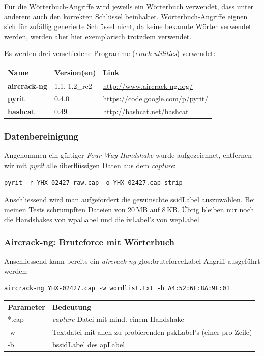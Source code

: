 Für die Wörterbuch-Angriffe wird jeweils ein Wörterbuch verwendet, dass unter anderem auch den korrekten Schlüssel beinhaltet.
Wörterbuch-Angriffe eignen sich für zufällig generierte Schlüssel nicht, da keine bekannte Wörter verwendet werden, werden aber hier exemplarisch trotzdem verwendet.

Es werden drei verschiedene Programme (\textit{crack utilities}) verwendet:
\begin{table}[H]
\small\sffamily\centering\renewcommand{\arraystretch}{1.4}
\begin{tabular}{l l l}
\hline
\rowcolor{tableheadcolor}
  \bfseries Name  &
  \bfseries Version(en) &
  \bfseries Link \\
\hline
  \textbf{aircrack-ng} & 1.1, 1.2\_rc2 & \url{http://www.aircrack-ng.org/}\\
  \textbf{pyrit} & 0.4.0 & \url{https://code.google.com/p/pyrit/}\\
  \textbf{hashcat} & 0.49 & \url{http://hashcat.net/hashcat}\\
\hline
\end{tabular}
\end{table}


\subsubsection{Datenbereinigung}
Angenommen ein gültiger \textit{Four-Way Handshake} wurde aufgezeichnet, entfernen wir mit \textit{pyrit} alle überflüssigen Daten aus dem \textit{capture}:
\begin{lstlisting}[style=lstStyleFramed]
pyrit -r YHX-02427_raw.cap -o YHX-02427.cap strip
\end{lstlisting}
Anschliessend wird man aufgefordert die gewünschte \gls{ssidLabel} auszuwählen.
Bei meinen Tests schrumpften Dateien von 20\,MB auf 8\,KB.
Übrig bleiben nur noch die Handshakes von \gls{wpaLabel} und die \gls{ivLabel}'s von \gls{wepLabel}.

\subsubsection{Aircrack-ng: Bruteforce mit Wörterbuch}
Anschliessend kann bereits ein \textit{aircrack-ng} \gls{glos:bruteforceLabel}-Angriff ausgeführt werden:
\begin{lstlisting}[style=lstStyleFramed]
aircrack-ng YHX-02427.cap -w wordlist.txt -b A4:52:6F:8A:9F:01
\end{lstlisting}
\begin{tabular}{l l}
	\textbf{Parameter} & \textbf{Bedeutung}\\
	*.cap & \textit{capture}-Datei mit mind. einem Handshake\\
	-w	& Textdatei mit allen zu probierenden \gls{pskLabel}'s (einer pro Zeile)\\
	-b	& \gls{bssidLabel} des \gls{apLabel}\\
\end{tabular}

